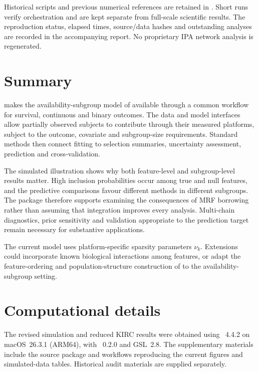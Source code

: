 \documentclass[article]{jss}
\begin{document}
Historical scripts and previous numerical references are retained in
. Short runs verify orchestration and are kept separate
from full-scale scientific results. The reproduction status, elapsed times,
source/data hashes and outstanding analyses are recorded in the accompanying
report. No proprietary IPA network analysis is regenerated.

\section{Summary}\label{sec:summary}

 makes the availability-subgroup model of
\citet{chekouo2017} available through a common  workflow for
survival, continuous and binary outcomes. The data and model interfaces allow
partially observed subjects to contribute through their measured platforms,
subject to the outcome, covariate and subgroup-size requirements. Standard
methods then connect fitting to selection summaries, uncertainty assessment,
prediction and cross-validation.

The simulated illustration shows why both feature-level and subgroup-level
results matter. High inclusion probabilities occur among true and null
features, and the predictive comparisons favour different methods in different
subgroups. The package therefore supports examining the consequences of MRF
borrowing rather than assuming that integration improves every analysis.
Multi-chain diagnostics, prior sensitivity and validation appropriate to the
prediction target remain necessary for substantive applications.

The current model uses platform-specific sparsity parameters $\nu_k$.
Extensions could incorporate known biological interactions among features, or
adapt the feature-ordering and population-structure construction of
\citet{dai2023} to the availability-subgroup setting.

\section*{Computational details}
The revised simulation and reduced KIRC results were obtained using
~4.4.2 on macOS~26.3.1 (ARM64), with ~0.2.0
and GSL~2.8. The supplementary materials include the source package and
workflows reproducing the current figures and simulated-data tables.
Historical audit materials are supplied separately.
\end{document}
